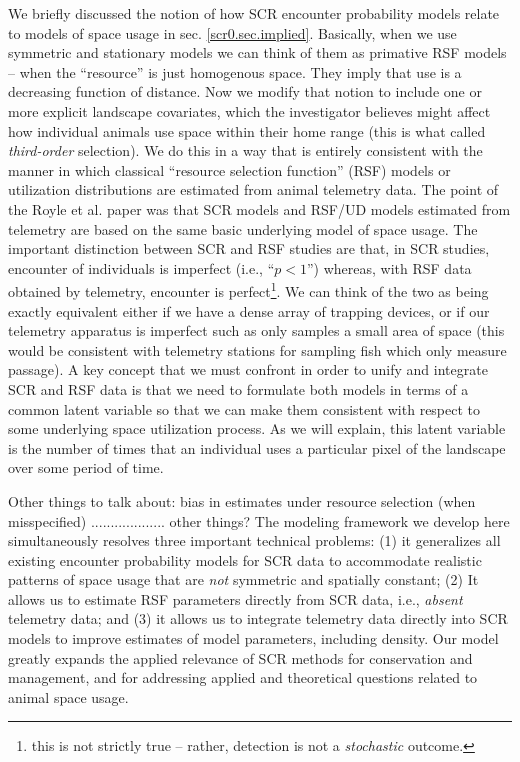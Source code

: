 
We briefly discussed the notion of how SCR encounter probability
models relate to models of space usage
in sec. \ref{scr0.sec.implied}. Basically, when we use symmetric and
stationary models we can think of them as primative RSF models --
when the ``resource'' is just homogenous space. They imply that use is
a decreasing function of distance.
Now we modify that notion to include one or 
more explicit landscape covariates, which the investigator believes
might affect how individual animals use space within their home range
(this is what \citep{johnson:1980} called {\it third-order}
selection). We do this in a way that is entirely consistent with the
manner in which classical ``resource selection function'' (RSF) models
\citep{manly_etal:2002} or utilization distributions
\citep{worton:1989, fieberg:2005, fieberg:2007} are estimated from
animal telemetry data.  
The point of the Royle et al. paper was that SCR models and 
RSF/UD models estimated from telemetry are based on the same basic
underlying model of space usage. The important distinction between SCR
and RSF studies are that, in SCR studies, encounter of individuals is
imperfect (i.e., ``$p<1$'') whereas, with RSF data obtained by
telemetry, encounter is perfect\footnote{this is not strictly true --
  rather, detection is not a {\it stochastic} outcome.}. We can think
of the two as being exactly equivalent either if we have a dense array
of trapping devices, or if our telemetry apparatus is imperfect such
as only samples a small area of space (this would be consistent with
telemetry stations for sampling fish which only measure passage).
A
key concept that we must confront in order to unify and integrate SCR
and RSF data is that we need to formulate both models in terms of a
common latent variable so that we can make them consistent with
respect to some underlying space utilization process. As we will
explain, this latent variable is the number of times that an
individual uses a particular pixel of the landscape over some period
of time.


Other things to talk about: bias in estimates under resource selection
(when misspecified) ................... other things?
The modeling framework we develop here
simultaneously resolves three important technical problems: (1) it
generalizes all existing encounter probability models for SCR data to
accommodate realistic patterns of space usage that are {\it not}
symmetric and spatially constant; (2) It allows us to estimate RSF
parameters directly from SCR data, i.e., {\it absent} telemetry data;
and (3) it allows us to integrate telemetry data directly into SCR
models to improve estimates of model parameters, including density.
Our model greatly expands the applied relevance of SCR methods for
conservation and management, and for addressing applied and
theoretical questions related to animal space usage.


